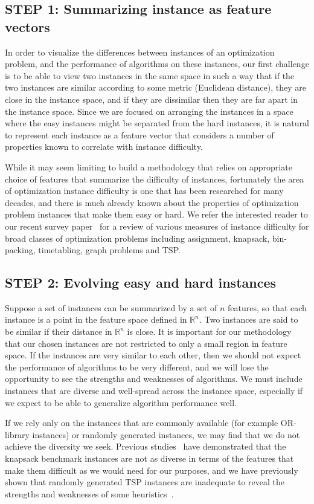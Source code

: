 \documentclass[conference]{IEEEtran}
\begin{document}
\subsection{STEP 1: Summarizing instance as feature vectors}
In order to visualize the differences between instances of an optimization problem, and the performance of algorithms on these instances, our first challenge is to be able to view two instances in the same space in such a way that if the two instances are similar according to some metric (Euclidean distance), they are close in the instance space, and if they are dissimilar then they are far apart in the instance space. Since we are focused on arranging the instances in a space where the easy instances might be separated from the hard instances, it is natural to represent each instance as a feature vector that considers a number of properties known to correlate with instance difficulty.

While it may seem limiting to build a methodology that relies on appropriate choice of features that summarize the difficulty of instances, fortunately the area of optimization instance difficulty is one that has been researched for many decades, and there is much already known about the properties of optimization problem instances that make them easy or hard. We refer the interested reader to our recent survey paper~\cite{CAOR} for a review of various measures of instance difficulty for broad classes of optimization problems including assignment, knapsack, bin-packing, timetabling, graph problems and TSP.


\subsection{STEP 2: Evolving easy and hard instances}
Suppose a set of instances can be summarized by a set of $n$ features, so that each instance is a point in the feature space defined in $\mathbb{R}^n$. Two instances are said to be similar if their distance in $\mathbb{R}^n$ is close. It is important for our methodology that our chosen instances are not restricted to only a small region in feature space. If the instances are very similar to each other, then we should not expect the performance of algorithms to be very different, and we will lose the opportunity to see the strengths and weaknesses of algorithms. We must include instances that are diverse and well-spread across the instance space, especially if we expect to be able to generalize algorithm performance well.

If we rely only on the instances that are commonly available (for example OR-library instances) or randomly generated instances, we may find that we do not achieve the diversity we seek. Previous studies~\cite{KnapsackHeuristics} have demonstrated that the knapsack benchmark instances are not as diverse in terms of the features that make them difficult as we would need for our purposes, and we have previously shown that randomly generated TSP instances are inadequate to reveal the strengths and weaknesses of some heuristics~\cite{AMAI}.
\end{document}
